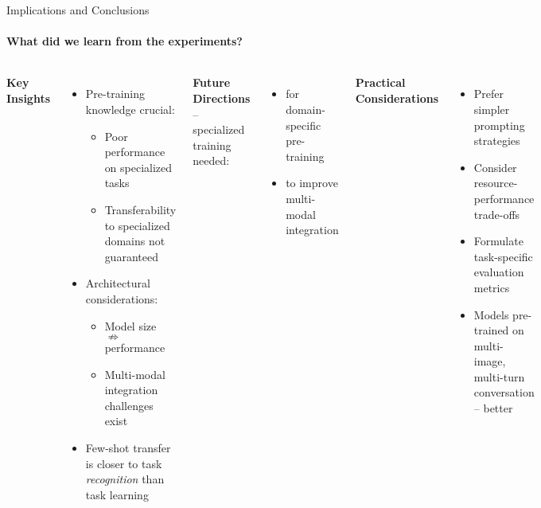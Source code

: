 \begin{frame}{Implications and Conclusions}
\framesubtitle{What did we learn from the experiments?}
  \vspace{-1em}
  \begin{columns}[T]
    \column{\customcolumnwidth}
      \textbf{Key Insights}
      \begin{itemize}
        \item Pre-training knowledge crucial:
          \begin{itemize}
            \item Poor performance on specialized tasks
            \item Transferability to specialized domains not guaranteed
          \end{itemize}
        \item Architectural considerations:
          \begin{itemize}
            \item Model size \(\nRightarrow\) performance
            \item Multi-modal integration challenges exist
          \end{itemize}
        \item Few-shot transfer is closer to task \emph{recognition} than task learning
      \end{itemize}
    \column{\customcolumnwidth}
      \textbf{Future Directions} -- specialized training needed:
      \begin{itemize}
        \item for domain-specific pre-training
        \item to improve multi-modal integration
      \end{itemize}
      \textbf{Practical Considerations}
      \begin{itemize}
        \item Prefer simpler prompting strategies
        \item Consider resource-performance trade-offs
        \item Formulate task-specific evaluation metrics
        \item Models pre-trained on multi-image, multi-turn conversation -- better
      \end{itemize}
  \end{columns}
\end{frame}
